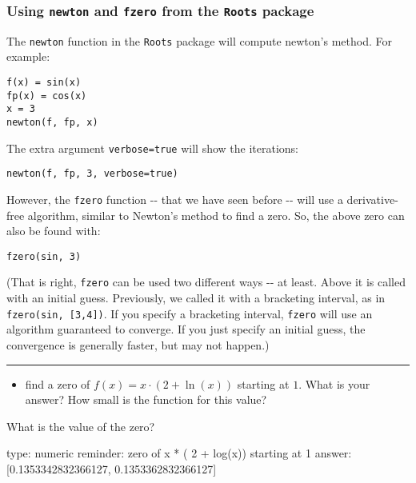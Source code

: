 \documentclass[12pt]{article}
\begin{document}
\subsubsection{Using \texttt{newton} and \texttt{fzero} from the
\texttt{Roots} package}

The \texttt{newton} function in the \texttt{Roots} package will compute
newton's method. For example:



\begin{verbatim}
f(x) = sin(x)
fp(x) = cos(x)
x = 3
newton(f, fp, x)
\end{verbatim}
The extra argument \texttt{verbose=true} will show the iterations:



\begin{verbatim}
newton(f, fp, 3, verbose=true)
\end{verbatim}
However, the \texttt{fzero} function -{}- that we have seen before -{}-
will use a derivative-free algorithm, similar to Newton's method to find
a zero. So, the above zero can also be found with:



\begin{verbatim}
fzero(sin, 3)
\end{verbatim}
(That is right, \texttt{fzero} can be used two different ways -{}- at
least. Above it is called with an initial guess. Previously, we called
it with a bracketing interval, as in \texttt{fzero(sin, {[}3,4{]})}. If
you specify a bracketing interval, \texttt{fzero} will use an algorithm
guaranteed to converge. If you just specify an initial guess, the
convergence is generally faster, but may not happen.)

\begin{center}\rule{3in}{0.4pt}\end{center}

\begin{itemize}
\itemsep1pt\parskip0pt
\item
  find a zero of $f(x) = x\cdot (2+\ln(x))$ starting at $1$. What is
  your answer? How small is the function for this value?
\end{itemize}

What is the value of the zero?

\begin{answer}
    type: numeric
    reminder: zero of x * ( 2 + log(x)) starting at 1
    answer: [0.1353342832366127, 0.1353362832366127]

\end{answer}
\end{document}

